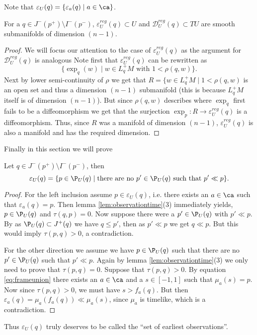 Note that $\varepsilon_U(q) = \{ \varepsilon_a(q) \mid a\in \ca \}$.

\begin{proposition} For a $q\in J^-(p^+)\setminus I^-(p^-)$, $\varepsilon^{reg}_U(q)\subset U$ and $\mathcal{D}^{reg}_U(q)\subset TU$ are smooth submanifolds of dimension $(n-1)$.
\end{proposition}
\begin{proof}
We will focus our attention to the case of $\varepsilon^{reg}_U(q)$ as the argument for  $\mathcal{D}^{reg}_U(q)$ is analogous
Note first that $\varepsilon^{reg}_U(q)$ can be rewritten as 
\[
    \{\exp_q(w) \mid  w\in L^+_qM \text{ with } 1<\rho(q,w)\}.
\]
Next by lower semi-continuity of $\rho$ we get that $R=\{w\in L^+_qM \mid 1<\rho(q,w)$ is an open set and thus a dimension $(n-1)$ submanifold (this is because $L^+_qM$ itself is of dimension $(n-1)$). But since $\rho(q,w)$ describes where $\exp_q$ first fails to be a diffeomorphism we get that the surjection $\exp_p:R\to \varepsilon^{reg}_U(q)$ is a diffeomorphism. Thus, since $R$ was a manifold of dimension $(n-1)$, $\varepsilon^{reg}_U(q)$ is also a manifold and has the required dimension.
\end{proof}

Finally in this section we will prove
\begin{proposition}\label{prop:seocharact}
Let $q\in J^-(p^+)\setminus I^-(p^-)$, then 
\begin{equation*}
    \varepsilon_U(q) = \{ p \in \P_U(q) \mid \text{there are no $p'\in \P_U(q)$ such that $p'\ll p$} \}.
\end{equation*}
\end{proposition}
\begin{proof}
For the left inclusion assume $p\in \varepsilon_U(q)$, i.e. there exists an $a\in \ca$ such that $\varepsilon_a(q)=p$. Then lemma \ref{lem:observationtime}(3) immediately yields, $p\in \P_U(q)$ and  $\tau(q,p)=0$. Now suppose there were a $p'\in \P_U(q)$ with $p'\ll p$. By as $\P_U(q)\subset J^+(q)$ we have $q\leq p'$, then as $p'\ll p$ we get $q\ll p$. But this would imply $\tau(p,q)>0$, a contradiction.

For the other direction we assume we have $p \in \P_U(q)$ such that there are no $p'\in\P_U(q)$ such that $p'\ll p$. Again by lemma \ref{lem:observationtime}(3) we only need to prove that $\tau(p,q)=0$. Suppose that $\tau(p,q)>0$. By equation \eqref{eq:frameunion} there exists an $a\in \ca$ and a $s\in [-1,1]$ such that $\mu_a(s) = p$. Now since $\tau(p,q)>0$, we must have $s > f_a(q)$. But then $\varepsilon_a(q) = \mu_a(f_a(q)) \ll  \mu_a(s)$, since $\mu_a$ is timelike, which is a contradiction.
\end{proof}
Thus $\varepsilon_U(q)$ truly deserves to be called the \enquote{set of earliest observations}.

